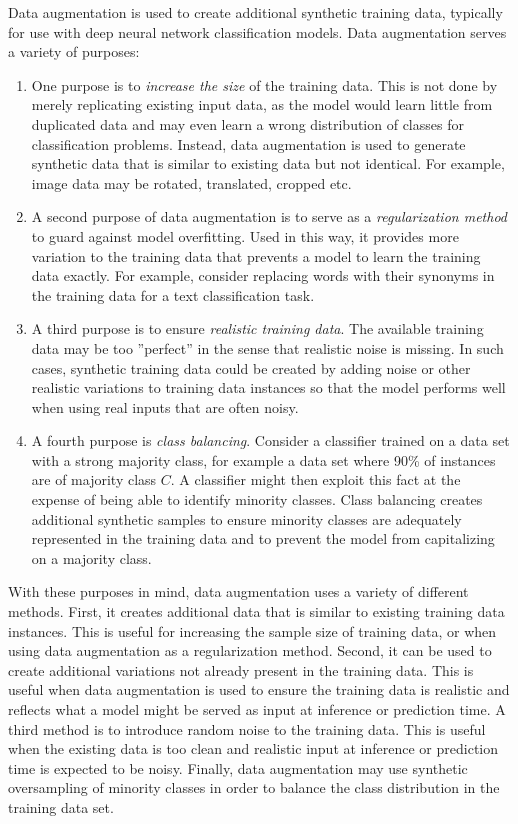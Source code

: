 Data augmentation is used to create additional synthetic training data, typically for use with deep neural network classification models. Data augmentation serves a variety of purposes:

\begin{enumerate}
\item One purpose is to \emph{increase the size} of the training data. This is not done by merely replicating existing input data, as the model would learn little from duplicated data and may even learn a wrong distribution of classes for classification problems. Instead, data augmentation is used to generate synthetic data that is similar to existing data but not identical. For example, image data may be rotated, translated, cropped etc. 

\item A second purpose of data augmentation is to serve as a \emph{regularization method} to guard against model overfitting. Used in this way, it provides more variation to the training data that prevents a model to learn the training data exactly. For example, consider replacing words with their synonyms in the training data for a text classification task. 

\item A third purpose is to ensure \emph{realistic training data}. The available training data may be too ''perfect'' in the sense that realistic noise is missing. In such cases, synthetic training data could be created by adding noise or other realistic variations to training data instances so that the model performs well when using real inputs that are often noisy.

\item A fourth purpose is  \emph{class balancing}. Consider a classifier trained on a data set with a strong majority class, for example a data set where 90\% of instances are of majority class $C$. A classifier might then exploit this fact at the expense of being able to identify minority classes. Class balancing creates additional synthetic samples to ensure minority classes are adequately represented in the training data and to prevent the model from capitalizing on a majority class.
\end{enumerate}

With these purposes in mind, data augmentation uses a variety of different methods. First, it creates additional data that is similar to existing training data instances. This is useful for increasing the sample size of training data, or when using data augmentation as a regularization method. Second, it can be used to create additional variations not already present in the training data. This is useful when data augmentation is used to ensure the training data is realistic and reflects what a model might be served as input at inference or prediction time. A third method is to introduce random noise to the training data. This is useful when the existing data is too clean and realistic input at inference or prediction time is expected to be noisy. Finally, data augmentation may use synthetic oversampling of minority classes in order to balance the class distribution in the training data set. 

